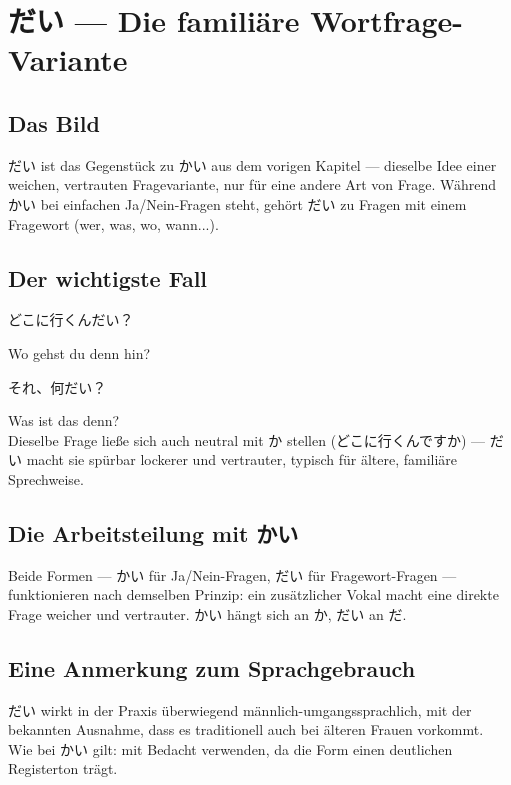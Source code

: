 \documentclass[12pt]{book}
\begin{document}
\chapter{だい — Die familiäre Wortfrage-Variante}

\section*{Das Bild}

だい ist das Gegenstück zu かい aus dem vorigen Kapitel — dieselbe Idee einer weichen, vertrauten Fragevariante, nur für eine andere Art von Frage. Während かい bei einfachen Ja/Nein-Fragen steht, gehört だい zu Fragen mit einem Fragewort (wer, was, wo, wann...).

\section*{Der wichtigste Fall}

\par\quad どこに行くんだい？\\
\par\quad Wo gehst du denn hin?\\

\par\quad それ、何だい？\\
\par\quad Was ist das denn?\\

Dieselbe Frage ließe sich auch neutral mit か stellen (どこに行くんですか) — だい macht sie spürbar lockerer und vertrauter, typisch für ältere, familiäre Sprechweise.

\section*{Die Arbeitsteilung mit かい}

Beide Formen — かい für Ja/Nein-Fragen, だい für Fragewort-Fragen — funktionieren nach demselben Prinzip: ein zusätzlicher Vokal macht eine direkte Frage weicher und vertrauter. かい hängt sich an か, だい an だ.

\section*{Eine Anmerkung zum Sprachgebrauch}

だい wirkt in der Praxis überwiegend männlich-umgangssprachlich, mit der bekannten Ausnahme, dass es traditionell auch bei älteren Frauen vorkommt. Wie bei かい gilt: mit Bedacht verwenden, da die Form einen deutlichen Registerton trägt.
\end{document}

